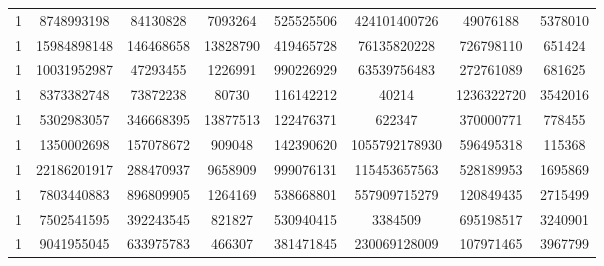 \documentclass[solution, letterpaper]{cs121}
\begin{document}
\begin{center}
\begin{tabular}{ c |c c c c c c c}
1 & 8748993198 & 84130828 & 7093264 & 525525506 & 424101400726 & 49076188 & 5378010 \\
1 & 15984898148 & 146468658 & 13828790 & 419465728 & 76135820228 & 726798110 & 651424 \\
1 & 10031952987 & 47293455 & 1226991 & 990226929 & 63539756483 & 272761089 & 681625 \\
1 & 8373382748 & 73872238 & 80730 & 116142212 & 40214 & 1236322720 & 3542016 \\
1 & 5302983057 & 346668395 & 13877513 & 122476371 & 622347 & 370000771 & 778455 \\
1 & 1350002698 & 157078672 & 909048 & 142390620 & 1055792178930 & 596495318 & 115368 \\
1 & 22186201917 & 288470937 & 9658909 & 999076131 & 115453657563 & 528189953 & 1695869 \\
1 & 7803440883 & 896809905 & 1264169 & 538668801 & 557909715279 & 120849435 & 2715499 \\
1 & 7502541595 & 392243545 & 821827 & 530940415 & 3384509 & 695198517 & 3240901 \\
1 & 9041955045 & 633975783 & 466307 & 381471845 & 230069128009 & 107971465 & 3967799 \\
\end{tabular}
\end{center}
\end{document}
